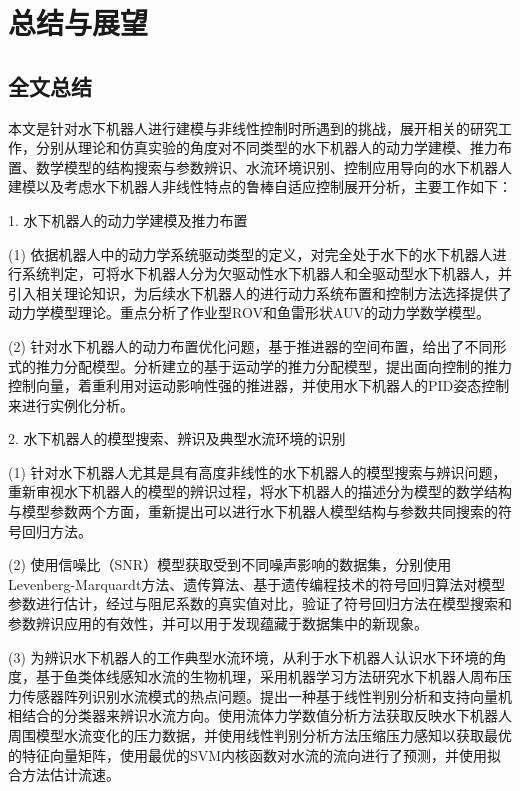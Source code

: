 
\chapter{总结与展望}

\label{chap:conclusion}
\section{全文总结}

本文是针对水下机器人进行建模与非线性控制时所遇到的挑战，展开相关的研究工作，分别从理论和仿真实验的角度对不同类型的水下机器人的动力学建模、推力布置、数学模型的结构搜索与参数辨识、水流环境识别、控制应用导向的水下机器人建模以及考虑水下机器人非线性特点的鲁棒自适应控制展开分析，主要工作如下：

1. 水下机器人的动力学建模及推力布置

(1) 依据机器人中的动力学系统驱动类型的定义，对完全处于水下的水下机器人进行系统判定，可将水下机器人分为欠驱动性水下机器人和全驱动型水下机器人，并引入相关理论知识，为后续水下机器人的进行动力系统布置和控制方法选择提供了动力学模型理论。重点分析了作业型ROV和鱼雷形状AUV的动力学数学模型。

(2) 针对水下机器人的动力布置优化问题，基于推进器的空间布置，给出了不同形式的推力分配模型。分析建立的基于运动学的推力分配模型，提出面向控制的推力控制向量，着重利用对运动影响性强的推进器，并使用水下机器人的PID姿态控制来进行实例化分析。

2. 水下机器人的模型搜索、辨识及典型水流环境的识别

(1) 针对水下机器人尤其是具有高度非线性的水下机器人的模型搜索与辨识问题，重新审视水下机器人的模型的辨识过程，将水下机器人的描述分为模型的数学结构与模型参数两个方面，重新提出可以进行水下机器人模型结构与参数共同搜索的符号回归方法。

(2) 使用信噪比（SNR）模型获取受到不同噪声影响的数据集，分别使用Levenberg-Marquardt方法、遗传算法、基于遗传编程技术的符号回归算法对模型参数进行估计，经过与阻尼系数的真实值对比，验证了符号回归方法在模型搜索和参数辨识应用的有效性，并可以用于发现蕴藏于数据集中的新现象。

(3) 为辨识水下机器人的工作典型水流环境，从利于水下机器人认识水下环境的角度，基于鱼类体线感知水流的生物机理，采用机器学习方法研究水下机器人周布压力传感器阵列识别水流模式的热点问题。提出一种基于线性判别分析和支持向量机相结合的分类器来辨识水流方向。使用流体力学数值分析方法获取反映水下机器人周围模型水流变化的压力数据，并使用线性判别分析方法压缩压力感知以获取最优的特征向量矩阵，使用最优的SVM内核函数对水流的流向进行了预测，并使用拟合方法估计流速。

